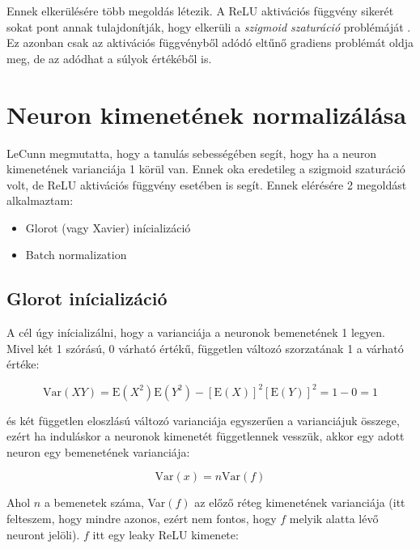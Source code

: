 \documentclass{article}
\begin{document}
Ennek elkerülésére több megoldás létezik. A ReLU aktivációs függvény sikerét sokat pont annak tulajdonítják, hogy elkerüli a \textit{szigmoid szaturáció} problémáját \cite{krizhevsky2012imagenet}. Ez azonban csak az aktivációs függvényből adódó eltűnő gradiens problémát oldja meg, de az adódhat a súlyok értékéből is.

\section{Neuron kimenetének normalizálása}

LeCunn megmutatta, hogy a tanulás sebességében segít, hogy ha a neuron kimenetének varianciája 1 körül van\cite{lecun1998efficient}. Ennek oka eredetileg a szigmoid szaturáció volt, de ReLU aktivációs függvény esetében is segít. Ennek elérésére 2 megoldást alkalmaztam:

\begin{itemize}
    \item Glorot (vagy Xavier) inícializáció \cite{glorot2010understanding}
    \item Batch normalization \cite{fcholl_batch_norm_szegedy}
\end{itemize}

\subsection{Glorot inícializáció}

A cél úgy inícializálni, hogy a varianciája a neuronok bemenetének 1 legyen. Mivel két 1 szórású, 0 várható értékű, független változó szorzatának 1 a várható értéke:

\begin{equation}
    \text{Var}(XY) = \text{E}(X^2)\text{E}(Y^2) - [\text{E}(X)]^2 [\text{E}(Y)]^2 = 1 - 0 = 1
\end{equation}

és két független eloszlású változó varianciája egyszerűen a varianciájuk összege, ezért ha induláskor a neuronok kimenetét függetlennek vesszük, akkor egy adott neuron egy bemenetének varianciája:

\begin{equation}
    \text{Var}(x) = n\text{Var}(f)
\end{equation}

Ahol $n$ a bemenetek száma, Var$(f)$ az előző réteg kimenetének varianciája (itt felteszem, hogy mindre azonos, ezért nem fontos, hogy $f$ melyik alatta lévő neuront jelöli). $f$ itt egy leaky ReLU kimenete:
\end{document}
